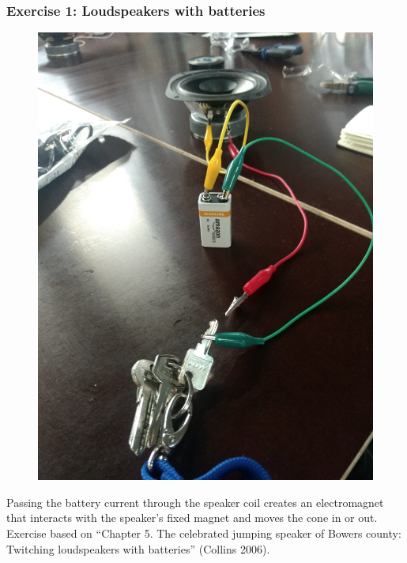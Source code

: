 \documentclass[screen, aspectratio=169]{beamer}
\begin{document}
\begin{frame}
  \frametitle{Exercise 1: Loudspeakers with batteries}
   \begin{figure}
	\includegraphics[scale=0.2]{img/loudspeakers-batteries.png}
\end{figure}
{\scriptsize 
Passing the battery current through the speaker coil creates an electromagnet that interacts with the speaker's fixed magnet and moves the cone in or out.\\
}    
{\tiny
Exercise based on ``Chapter 5. The celebrated jumping speaker of Bowers county: Twitching loudspeakers with batteries'' (Collins 2006).
}
\end{frame}
%
\end{document}
